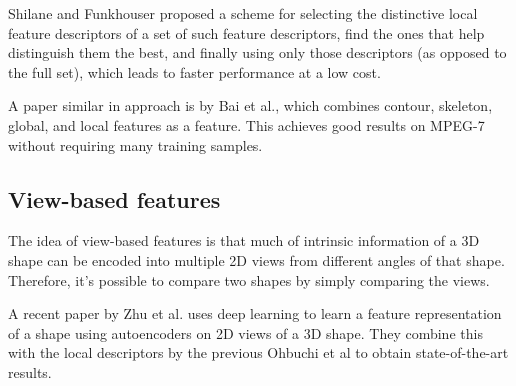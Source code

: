 \documentclass[../tech_report_1.tex]{subfiles}
\begin{document}
Shilane and Funkhouser\cite{shilane2006selecting} proposed a scheme for selecting the distinctive local feature descriptors of a set of such feature descriptors, find the ones that help distinguish them the best, and finally using only those descriptors (as opposed to the full set), which leads to faster performance at a low cost.

A paper similar in approach is by Bai et al.\cite{bai2009integrating}, which combines contour, skeleton, global, and local features as a feature. This achieves good results on MPEG-7 without requiring many training samples.

\subsection{View-based features}

The idea of view-based features is that much of intrinsic information of a 3D shape can be encoded into multiple 2D views from different angles of that shape. Therefore, it's possible to compare two shapes by simply comparing the views.

A recent paper by Zhu et al.\cite{zhu2016deep} uses deep learning to learn a feature representation of a shape using autoencoders on 2D views of a 3D shape. They combine this with the local descriptors by the previous Ohbuchi et al\cite{ohbuchi2008salient} to obtain state-of-the-art results. 
\end{document}
